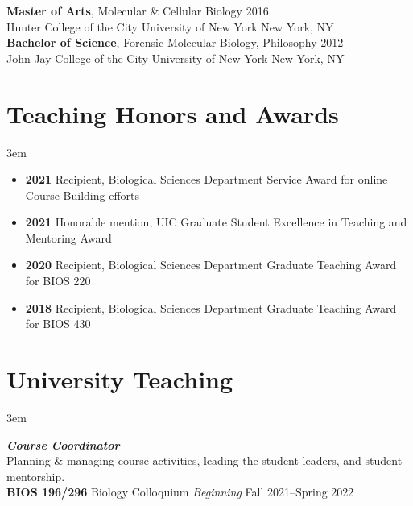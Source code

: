 \documentclass[]{article}
\begin{document}
\textbf{Master of Arts}, Molecular \& Cellular Biology \hfill 2016\\ 
Hunter College of the City University of New York \hfill New York, NY\\
     

\textbf{Bachelor of Science}, Forensic Molecular Biology, Philosophy \hfill 2012\\ 
John Jay College of the City University of New York \hfill New York, NY

\vspace{3mm}
\section{Teaching Honors and Awards}

\vspace{3mm}
\leftskip 3em

\begin{itemize}[label=$\mathwitch*$]
\item{\textbf{2021} Recipient, Biological Sciences Department Service Award for online Course Building efforts}
\item{\textbf{2021} Honorable mention, UIC Graduate Student Excellence in Teaching and Mentoring Award}
\item{\textbf{2020} Recipient, Biological Sciences Department Graduate Teaching Award for BIOS 220}
\item{\textbf{2018} Recipient, Biological Sciences Department Graduate Teaching Award for BIOS 430}
\end{itemize}

\vspace{2mm}
\section{University Teaching}

\vspace{3mm}
\leftskip 3em

\textit{\textbf{Course Coordinator}}\\
Planning \& managing course activities, leading the student leaders, and student mentorship.\\

\textbf{BIOS 196/296} Biology Colloquium \href{https://www.uicbcq.org/}{\faLink} \hfill \textit{Beginning} Fall 2021--Spring 2022\\%
\end{document}
